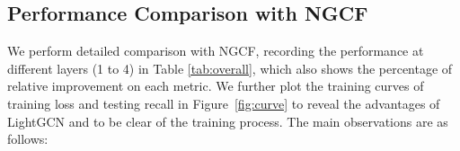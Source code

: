 \documentclass[sigconf]{acmart}
\theoremstyle{definition}
\begin{document}
\begin{figure*}[t]
	\centering
	\vspace{-15pt}
	\caption{Training curves of LightGCN and NGCF, which are evaluated by training loss and testing recall per 20 epochs on Gowalla and Amazon-Book (results on Yelp2018 show exactly the same trend which are omitted for space).} \vspace{-10pt}
	\label{fig:curve}
\end{figure*}

\subsection{Performance Comparison with NGCF}\label{ss:exp-ngcf}
We perform detailed comparison with NGCF, recording the performance at different layers (1 to 4) in Table \ref{tab:overall}, which also shows the percentage of relative improvement on each metric. 
We further plot the training curves of training loss and testing recall in Figure~\ref{fig:curve} to reveal the advantages of LightGCN and to be clear of the training process. 
The main observations are as follows:
\end{document}
